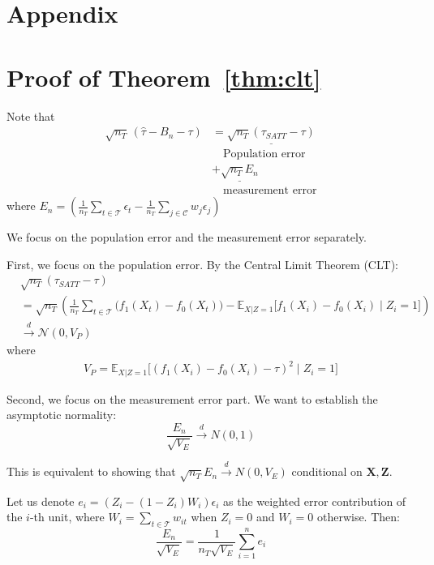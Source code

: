 \documentclass{mytemplate}
\begin{document}




\newpage
\appendix

\section*{Appendix}


\section{Proof of Theorem~\ref{thm:clt} }
Note that
\begin{align*}
    \sqrt{n_T}\,(\hat \tau - B_n - \tau) &= \underline{\sqrt{n_T} ( \tau_{SATT} - \tau)} \\
    &\quad\text{Population error} \\
    &+ \underline{\sqrt{n_T} E_n } \\
    &\quad\text{measurement error}
\end{align*}
where $E_n = \left(\frac{1}{n_T} \sum_{t \in \mathcal{T}} \epsilon_t - \frac{1}{n_T} \sum_{j \in \mathcal{C}} w_j \epsilon_j \right)$

We focus on the population error and the measurement error separately.

First, we focus on the population error. By the Central Limit Theorem (CLT):
\begin{align*}
    &\sqrt{n_T} ( \tau_{SATT} - \tau)\\
    &= \sqrt{n_T} \left(\frac{1}{n_T} \sum_{t \in \mathcal{T}} \bigl(f_1(X_t) - f_0(X_t)\bigr) - \mathbb{E}_{X|Z=1}\bigl[f_1(X_i) - f_0(X_i) \mid Z_i = 1\bigr] \right)\\
    &\xrightarrow{d} \mathcal{N}(0, V_{P})
\end{align*}
where 
\begin{align}
    V_{P} = \mathbb{E}_{X|Z=1}\bigl[(f_1(X_i) - f_0(X_i) - \tau)^2 \mid Z_i = 1 \bigr]
\end{align}

Second, we focus on the measurement error part. We want to establish the asymptotic normality:
\begin{equation}
\frac{E_n}{\sqrt{V_E}} \xrightarrow{d} N(0,1)
\end{equation}

This is equivalent to showing that $\sqrt{n_T} E_n \xrightarrow{d} N(0,V_E)$ conditional on $\mathbf{X}, \mathbf{Z}$.

Let us denote $e_i = (Z_i - (1-Z_i)W_i)\epsilon_i$ as the weighted error contribution of the $i$-th unit, where $W_i = \sum_{t \in \mathcal{T}} w_{it}$ when $Z_i = 0$ and $W_i = 0$ otherwise. Then:
\begin{equation}
\frac{E_n}{\sqrt{V_E}} = \frac{1}{n_T\sqrt{V_E}} \sum_{i=1}^n e_i
\end{equation}
\end{document}
